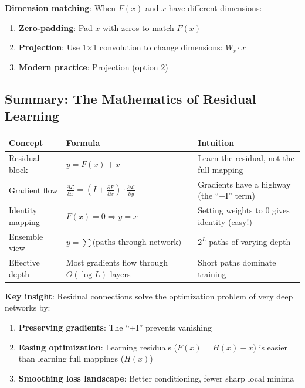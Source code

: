 \documentclass[11pt,oneside]{book}
\begin{document}
\textbf{Dimension matching}: When $F(x)$ and $x$ have different dimensions:
\begin{enumerate}
\item \textbf{Zero-padding}: Pad $x$ with zeros to match $F(x)$
\item \textbf{Projection}: Use 1×1 convolution to change dimensions: $W_s \cdot x$
\item \textbf{Modern practice}: Projection (option 2)
\end{enumerate}

\subsection{Summary: The Mathematics of Residual Learning}

\begin{table}[h]
\centering
\begin{tabular}{lll}
\toprule
\textbf{Concept} & \textbf{Formula} & \textbf{Intuition} \\
\midrule
Residual block & $y = F(x) + x$ & Learn the residual, not the full mapping \\
Gradient flow & $\frac{\partial \mathcal{L}}{\partial x} = (I + \frac{\partial F}{\partial x}) \cdot \frac{\partial \mathcal{L}}{\partial y}$ & Gradients have a highway (the ``+I'' term) \\
Identity mapping & $F(x) = 0 \Rightarrow y = x$ & Setting weights to 0 gives identity (easy!) \\
Ensemble view & $y = \sum \text{(paths through network)}$ & $2^L$ paths of varying depth \\
Effective depth & Most gradients flow through $O(\log L)$ layers & Short paths dominate training \\
\bottomrule
\end{tabular}
\end{table}

\textbf{Key insight}: Residual connections solve the optimization problem of very deep networks by:
\begin{enumerate}
\item \textbf{Preserving gradients}: The ``+I'' prevents vanishing
\item \textbf{Easing optimization}: Learning residuals ($F(x) = H(x) - x$) is easier than learning full mappings ($H(x)$)
\item \textbf{Smoothing loss landscape}: Better conditioning, fewer sharp local minima
\end{enumerate}
\end{document}
